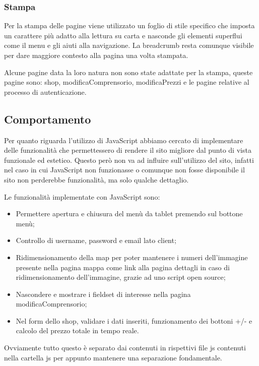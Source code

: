 \subsubsection{Stampa}
Per la stampa delle pagine viene utilizzato un foglio di stile specifico che imposta un carattere più adatto alla lettura su carta e nasconde gli elementi superflui come il menu e gli aiuti alla navigazione.
La breadcrumb resta comunque visibile per dare maggiore contesto alla pagina una volta stampata.



Alcune pagine data la loro natura non sono state adattate per la stampa, queste pagine sono: shop, modificaComprensorio, modificaPrezzi e le pagine relative al processo di autenticazione.

\newpage
\subsection{Comportamento}

Per quanto riguarda l'utilizzo di JavaScript abbiamo cercato di implementare delle funzionalità che permettessero di rendere il sito migliore dal punto di vista funzionale ed estetico.
Questo però non va ad influire sull'utilizzo del sito, infatti nel caso in cui JavaScript non funzionasse o comunque non fosse disponibile il sito non perderebbe funzionalità, ma solo qualche dettaglio.

Le funzionalità implementate con JavaScript sono:
\begin{itemize}
    \item Permettere apertura e chiusura del menù da tablet premendo sul bottone menù;
    \item Controllo di username, password e email lato client;
    \item Ridimensionamento della map per poter mantenere i numeri dell'immagine presente nella pagina mappa come link alla pagina dettagli in caso di ridimensionamento dell'immagine, grazie ad uno script open source;
    \item Nascondere e mostrare i fieldset di interesse nella pagina modificaComprensorio;
    \item Nel form dello shop, validare i dati inseriti, funzionamento dei bottoni +/- e calcolo del prezzo totale in tempo reale.
\end{itemize}

Ovviamente tutto questo è separato dai contenuti in rispettivi file js contenuti nella cartella js per appunto mantenere una separazione fondamentale.

